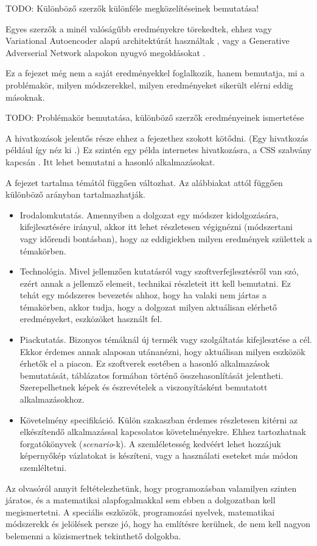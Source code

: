 TODO: Különböző szerzők különféle megközelítéseinek bemutatása!

Egyes szerzők a minél valóságűbb eredményekre törekedtek, ehhez vagy Variational Autoencoder alapú architektúrát használtak \cite{ramesh2021zero}, vagy a Generative Adverserial Network alapokon nyugvó megoldásokat \cite{dong2021unsupervised, reed2016learning, xu2018attngan, zhang2017stackgan}.


Ez a fejezet még nem a saját eredményekkel foglalkozik, hanem bemutatja, mi a problémakör, milyen módszerekkel, milyen eredményeket sikerült elérni eddig másoknak.


TODO: Problémakör bemutatása, különböző szerzők eredményeinek ismertetése


A hivatkozások jelentős része ehhez a fejezethez szokott kötődni.
(Egy hivatkozás például így néz ki \cite{coombs1987markup}.)
Ez szintén egy példa internetes hivatkozásra, a CSS szabvány kapcsán \cite{css}.
Itt lehet bemutatni a hasonló alkalmazásokat.


A fejezet tartalma témától függően változhat. Az alábbiakat attól függően különböző arányban tartalmazhatják.
\begin{itemize}
\item Irodalomkutatás. Amennyiben a dolgozat egy módszer kidolgozására, kifejlesztésére irányul, akkor itt lehet részletesen végignézni (módszertani vagy időrendi bontásban), hogy az eddigiekben milyen eredmények születtek a témakörben.
\item Technológia. Mivel jellemzően kutatásról vagy szoftverfejlesztésről van szó, ezért annak a jellemző elemeit, technikai részleteit itt kell bemutatni.
Ez tehát egy módszeres bevezetés ahhoz, hogy ha valaki nem jártas a témakörben, akkor tudja, hogy a dolgozat milyen aktuálisan elérhető eredményeket, eszközöket használt fel.
\item Piackutatás. Bizonyos témáknál új termék vagy szolgáltatás kifejlesztése a cél.
Ekkor érdemes annak alaposan utánanézni, hogy aktuálisan milyen eszközök érhetők el a piacon.
Ez szoftverek esetében a hasonló alkalmazások bemutatását, táblázatos formában történő összehasonlítását jelentheti.
Szerepelhetnek képek és észrevételek a viszonyításként bemutatott alkalmazásokhoz.
\item Követelmény specifikáció. Külön szakaszban érdemes részletesen kitérni az elkészítendő alkalmazással kapcsolatos követelményekre.
Ehhez tartozhatnak forgatókönyvek (\textit{scenario}-k).
A szemléletesség kedvéért lehet hozzájuk képernyőkép vázlatokat is készíteni, vagy a használati eseteket más módon szemléltetni.
\end{itemize}


Az olvasóról annyit feltételezhetünk, hogy programozásban valamilyen szinten járatos, és a matematikai alapfogalmakkal sem ebben a dolgozatban kell megismertetni.
A speciális eszközök, programozási nyelvek, matematikai módszerekk és jelölések persze jó, hogy ha említésre kerülnek, de nem kell nagyon belemenni a közismertnek tekinthető dolgokba.

